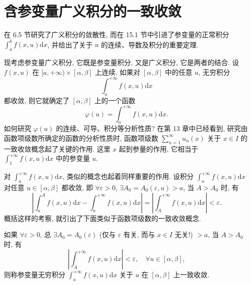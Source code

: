 \section{含参变量广义积分的一致收敛}\label{sec:15.2}

在 6.5 节研究了广义积分的敛散性, 而在 15.1 节中引进了参变量的正常积分 $\displaystyle\int_{a}^{b}f(x,u)\mathrm{d}x$, 并给出了关于 $u$ 的连续、导数及积分的重要定理.

现考虑参变量广义积分, 它既是参变量积分, 又是广义积分, 它是两者的结合. 设 $f(x,u)$ 在 $[a,+\infty)\times[\alpha,\beta]$ 上连续. 如果对 $[\alpha,\beta]$ 中的任意 $u$, 无穷积分
\[
  \int_{a}^{+\infty}f(x,u)\mathrm{d}x
\]
都收敛, 则它就确定了 $[\alpha,\beta]$ 上的一个函数
\[
  \varphi(u)=\int_{a}^{+\infty}f(x,u)\mathrm{d}x.
\]
如何研究 $\varphi(u)$ 的连续、可导、积分等分析性质? 在第 13 章中已经看到, 研究由函数项级数所确定的函数的分析性质时, 函数项级数 $\sum_{n=1}^{\infty}u_{n}(x)$ 关于 $x\in I$ 的一致收敛概念起了关键的作用. 这里 $x$ 起到参量的作用, 它相当于 $\displaystyle\int_{1}^{+\infty}f(x,u)\mathrm{d}x$ 中的参变量 $u$.

对 $\displaystyle\int_{a}^{+\infty}f(x,u)\mathrm{d}x$, 类似的概念也起着同样重要的作用. 设积分 $\displaystyle\int_{a}^{+\infty}f(x,u)\mathrm{d}x$ 对任意 $u\in[\alpha,\beta]$ 都收敛, 即 $\forall\varepsilon>0$, $\exists A_{0}=A_{0}(\varepsilon,u)>a$, 当 $A>A_{0}$ 时, 有
\[
  \left|\int_{a}^{A}f(x,u)\mathrm{d}x-\int_{a}^{+\infty}f(x,u)\mathrm{d}x\right|=\left|\int_{A}^{+\infty}f(x,u)\mathrm{d}x\right|<\varepsilon.
\]
概括这样的考察, 就引出了下面类似于函数项级数的一致收敛概念.

\begin{definition}\label{def:15.2.1}
如果 $\forall\varepsilon>0$, 总 $\exists A_{0}=A_{0}(\varepsilon)$ (仅与 $\varepsilon$ 有关, 而与 $x\in I$ 无关!) $>a$, 当 $A>A_{0}$ 时, 有
\[
  \left|\int_{A}^{+\infty}f(x,u)\mathrm{d}x\right|<\varepsilon,\quad\forall u\in[\alpha,\beta],
\]
则称参变量无穷积分 $\displaystyle\int_{a}^{+\infty}f(x,u)\mathrm{d}x$ 关于 $u$ 在 $[\alpha,\beta]$ 上一致收敛.
\end{definition}


